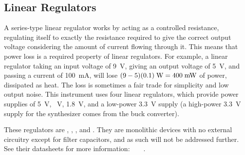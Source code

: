 \subsection{Linear Regulators}
A series-type linear regulator works by acting as a controlled resistance,
regulating itself to exactly the resistance required to give the correct
output voltage considering the amount of current flowing through it. This
means that power loss is a required property of linear regulators. For example,
a linear regulator taking an input voltage of 9~V, giving an output
voltage of 5~V, and passing a current of 100~mA, will
lose $(9-5)(0.1)\;\mathrm{W} = 400\;\mathrm{mW}$ of power, dissipated as heat.
The loss is sometimes a fair trade for simplicity and low output noise.
This instrument uses four linear regulators, which provide power supplies
of 5~V, ~V, 1.8~V, and a low-power 3.3~V
supply (a high-power 3.3~V supply for the synthesizer comes from
the buck converter).

These regulators are , , , and .
They are monolithic devices with no external circuitry except for filter
capacitors, and as such will not be addressed further. See their datasheets for
more information:~\cite{l78m05}~\cite{mc79m00}~\cite{az1117c}~\cite{mcp1700}.

